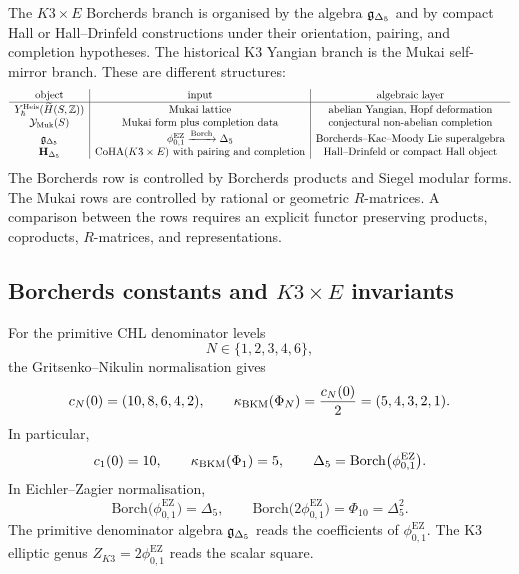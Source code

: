 The \(K3\times E\) Borcherds branch is organised by the algebra
\(\mathfrak{g}_{\Delta_5}\) and by compact Hall or Hall--Drinfeld constructions
under their orientation, pairing, and completion hypotheses.  The
historical K3 Yangian branch is the Mukai self-mirror branch.  These
are different structures:
\[
\begin{array}{c|c|c}
\text{object} & \text{input} & \text{algebraic layer}\\ \hline
Y_\hbar^{\mathrm{Heis}}(\widetilde H(S,\mathbb{Z})) &
\text{Mukai lattice} &
\text{abelian Yangian, Hopf deformation}\\
\mathcal Y_{\mathrm{Muk}}(S) &
\text{Mukai form plus completion data} &
\text{conjectural non-abelian completion}\\
\mathfrak{g}_{\Delta_5} &
\phi_{0,1}^{\mathrm{EZ}}\xrightarrow{\mathrm{Borch}}\Delta_5 &
\text{Borcherds--Kac--Moody Lie superalgebra}\\
\mathbf H_{\Delta_5} &
\mathrm{CoHA}(K3\times E)\ \text{with pairing and completion} &
\text{Hall--Drinfeld or compact Hall object}
\end{array}
\]
The Borcherds row is controlled by Borcherds products and Siegel
modular forms.  The Mukai rows are controlled by rational or geometric
\(R\)-matrices.  A comparison between the rows requires an explicit
functor preserving products, coproducts, \(R\)-matrices, and
representations.

\subsection*{Borcherds constants and \(K3\times E\) invariants}

For the primitive CHL denominator levels
\[
  N\in\{1,2,3,4,6\},
\]
the Gritsenko--Nikulin normalisation gives
\[
  c_N(0)=(10,8,6,4,2),
  \qquad
  \kappa_{\mathrm{BKM}}(\Phi_N)=\frac{c_N(0)}{2}=(5,4,3,2,1).
\]
In particular,
\[
  c_1(0)=10,\qquad
  \kappa_{\mathrm{BKM}}(\Phi_1)=5,
  \qquad
  \Delta_5=\mathrm{Borch}\bigl(\phi_{0,1}^{\mathrm{EZ}}\bigr).
\]
In Eichler--Zagier normalisation,
\[
  \mathrm{Borch}\bigl(\phi_{0,1}^{\mathrm{EZ}}\bigr)=\Delta_5,
  \qquad
  \mathrm{Borch}\bigl(2\phi_{0,1}^{\mathrm{EZ}}\bigr)
  =
  \Phi_{10}
  =
  \Delta_5^2 .
\]
The primitive denominator algebra \(\mathfrak{g}_{\Delta_5}\) reads the
coefficients of \(\phi_{0,1}^{\mathrm{EZ}}\).  The K3 elliptic genus
\(Z_{K3}=2\phi_{0,1}^{\mathrm{EZ}}\) reads the scalar square.

